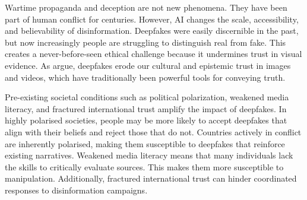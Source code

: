 Wartime propaganda and deception are not new phenomena. They have been part of human conflict for centuries. However, AI changes the scale, accessibility, and believability of disinformation. Deepfakes were easily discernible in the past, but now increasingly people are struggling to distinguish real from fake. This creates a never-before-seen ethical challenge because it undermines trust in visual evidence. As \citet{kenderdine2025deep} argue, deepfakes erode our cultural and epistemic trust in images and videos, which have traditionally been powerful tools for conveying truth.


Pre-existing societal conditions such as political polarization, weakened media literacy, and fractured international trust amplify the impact of deepfakes. In highly polarised societies, people may be more likely to accept deepfakes that align with their beliefs and reject those that do not. Countries actively in conflict are inherently polarised, making them susceptible to deepfakes that reinforce existing narratives. Weakened media literacy means that many individuals lack the skills to critically evaluate sources. This makes them more susceptible to manipulation. Additionally, fractured international trust can hinder coordinated responses to disinformation campaigns.